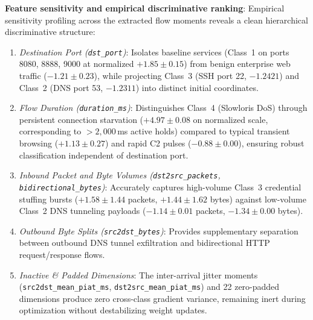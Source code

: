 \documentclass[journal,10pt,twocolumn]{IEEEtran}
\begin{document}
\textbf{Feature sensitivity and empirical discriminative ranking}: Empirical sensitivity profiling across the extracted flow moments reveals a clean hierarchical discriminative structure:
\begin{enumerate}
    \item \emph{Destination Port (\texttt{dst\_port})}: Isolates baseline services (Class~1 on ports 8080, 8888, 9000 at normalized $+1.85 \pm 0.15$) from benign enterprise web traffic ($-1.21 \pm 0.23$), while projecting Class~3 (SSH port 22, $-1.2421$) and Class~2 (DNS port 53, $-1.2311$) into distinct initial coordinates.
    \item \emph{Flow Duration (\texttt{duration\_ms})}: Distinguishes Class~4 (Slowloris DoS) through persistent connection starvation ($+4.97 \pm 0.08$ on normalized scale, corresponding to $>2{,}000$\,ms active holds) compared to typical transient browsing ($+1.13 \pm 0.27$) and rapid C2 pulses ($-0.88 \pm 0.00$), ensuring robust classification independent of destination port.
    \item \emph{Inbound Packet and Byte Volumes (\texttt{dst2src\_packets}, \texttt{bidirectional\_bytes})}: Accurately captures high-volume Class~3 credential stuffing bursts ($+1.58 \pm 1.44$ packets, $+1.44 \pm 1.62$ bytes) against low-volume Class~2 DNS tunneling payloads ($-1.14 \pm 0.01$ packets, $-1.34 \pm 0.00$ bytes).
    \item \emph{Outbound Byte Splits (\texttt{src2dst\_bytes})}: Provides supplementary separation between outbound DNS tunnel exfiltration and bidirectional HTTP request/response flows.
    \item \emph{Inactive \& Padded Dimensions}: The inter-arrival jitter moments (\texttt{src2dst\_mean\_piat\_ms}, \texttt{dst2src\_mean\_piat\_ms}) and 22 zero-padded dimensions produce zero cross-class gradient variance, remaining inert during optimization without destabilizing weight updates.
\end{enumerate}
\end{document}
